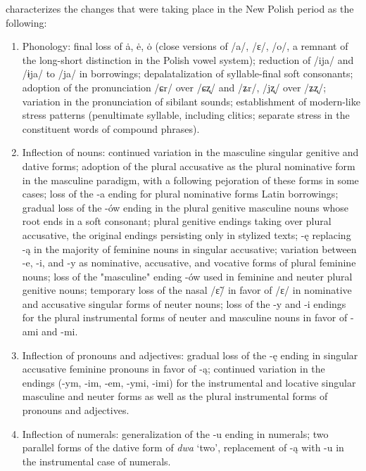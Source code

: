 \citet{klemensiewicz_76} characterizes the changes that were taking place in the New Polish period as the following:
\begin{enumerate}
    \item Phonology: final loss of ȧ, ė, ȯ (close versions of /a/, /ɛ/, /o/, a remnant of the long-short distinction in the Polish vowel system); reduction of /ija/ and /ɨja/ to /ja/ in borrowings; depalatalization of syllable-final soft consonants; adoption of the pronunciation /ɕr/ over /ɕʐ/ and /ʑr/, /jʐ/ over /ʑʐ/; variation in the pronunciation of sibilant sounds; establishment of modern-like stress patterns (penultimate syllable, including clitics; separate stress in the constituent words of compound phrases). 
    
    \item Inflection of nouns: continued variation in the masculine singular genitive and dative forms; adoption of the plural accusative as the plural nominative form in the masculine paradigm, with a following pejoration of these forms in some cases; loss of the -a ending for plural nominative forms Latin borrowings; gradual loss of the -ów ending in the plural genitive masculine nouns whose root ends in a soft consonant; plural genitive endings taking over plural accusative, the original endings persisting only in stylized texts; -ę replacing -ą in the majority of feminine nouns in singular accusative; variation between -e, -i, and -y as nominative, accusative, and vocative forms of plural feminine nouns; loss of the "masculine" ending -ów used in feminine and neuter plural genitive nouns; temporary loss of the nasal /ɛ̃/ in favor of /ɛ/ in nominative and accusative singular forms of neuter nouns; loss of the -y and -i endings for the plural instrumental forms of neuter and masculine nouns in favor of -ami and -mi.
    
    \item Inflection of pronouns and adjectives: gradual loss of the -ę ending in singular accusative feminine pronouns in favor of -ą; continued variation in the endings (-ym, -im, -em, -ymi, -imi) for the instrumental and locative singular masculine and neuter forms as well as the plural instrumental forms of pronouns and adjectives.
    
    \item Inflection of numerals: generalization of the -u ending in numerals; two parallel forms of the dative form of \textit{dwa} `two', replacement of -ą with -u in the instrumental case of numerals.
            

\end{enumerate}
